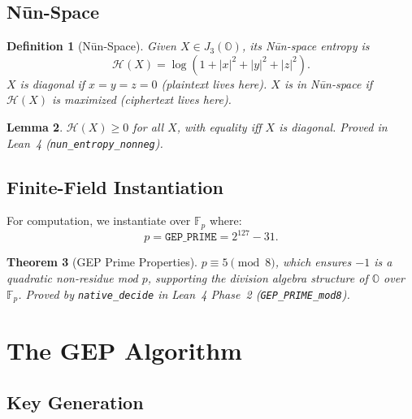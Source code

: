 \documentclass[11pt,letterpaper]{article}
\newtheorem{theorem}{Theorem}[section]
\newtheorem{lemma}[theorem]{Lemma}
\newtheorem{definition}[theorem]{Definition}
\theoremstyle{definition}
\begin{document}
\subsection{N\={u}n-Space}

\begin{definition}[N\={u}n-Space]
Given $X \in J_3(\mathbb{O})$, its \emph{N\={u}n-space entropy} is
\[
\mathcal{H}(X) = \log(1 + |x|^2 + |y|^2 + |z|^2).
\]
$X$ is \emph{diagonal} if $x = y = z = 0$ (plaintext lives here).
$X$ is in N\={u}n-space if $\mathcal{H}(X)$ is maximized (ciphertext lives here).
\end{definition}

\begin{lemma}
$\mathcal{H}(X) \geq 0$ for all $X$, with equality iff $X$ is diagonal.
\textit{Proved in Lean~4 (\texttt{nun\_entropy\_nonneg}).}
\end{lemma}

\subsection{Finite-Field Instantiation}

For computation, we instantiate over $\mathbb{F}_p$ where:
\[
p = \mathtt{GEP\_PRIME} = 2^{127} - 31.
\]

\begin{theorem}[GEP Prime Properties]
$p \equiv 5 \pmod{8}$, which ensures $-1$ is a quadratic non-residue mod $p$,
supporting the division algebra structure of $\mathbb{O}$ over $\mathbb{F}_p$.
\textit{Proved by} \texttt{native\_decide} \textit{in Lean~4 Phase~2
(\texttt{GEP\_PRIME\_mod8})}.
\end{theorem}

\section{The GEP Algorithm}
\label{sec:algorithm}

\subsection{Key Generation}
\end{document}
